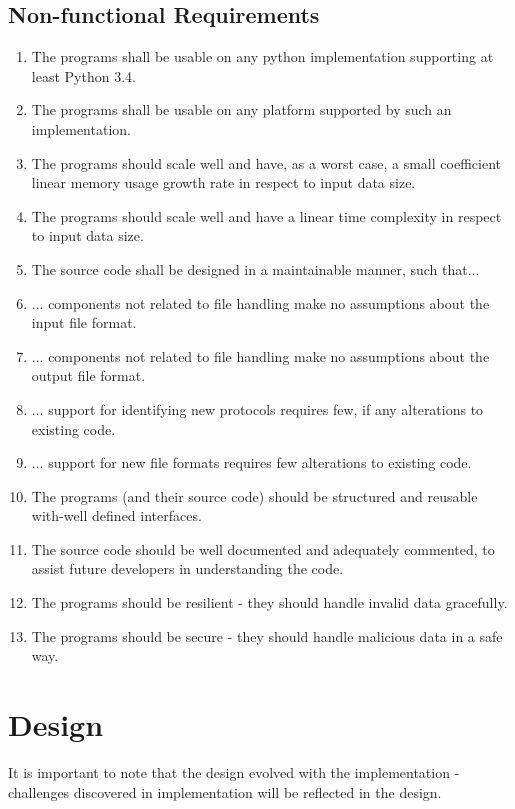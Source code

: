 \documentclass[10pt,a4paper,notitlepage,twoside]{report}
\begin{document}
\section{Non-functional Requirements}
\begin{enumerate}[label=\bfseries NFR\arabic*:]
\item \label{nfr:1} The programs shall be usable on any python implementation supporting at least Python 3.4.
\item \label{nfr:2} The programs shall be usable on any platform supported by such an implementation.
\item \label{nfr:3} The programs should scale well and have, as a worst case, a small coefficient linear memory usage growth rate in respect to input data size.
\item \label{nfr:4} The programs should scale well and have a linear time complexity in respect to input data size.
\item \label{nfr:5} The source code shall be designed in a maintainable manner, such that...
\item \label{nfr:6} ... components not related to file handling make no assumptions about the input file format.
\item \label{nfr:7} ... components not related to file handling make no assumptions about the output file format.
\item \label{nfr:8} ... support for identifying new protocols requires few, if any alterations to existing code.
\item \label{nfr:9} ... support for new file formats requires few alterations to existing code.
\item \label{nfr:10} The programs (and their source code) should be structured and reusable with-well defined interfaces.
\item \label{nfr:11} The source code should be well documented and adequately commented, to assist future developers in understanding the code.
\item \label{nfr:12} The programs should be resilient - they should handle invalid data gracefully.
\item \label{nfr:13} The programs should be secure - they should handle malicious data in a safe way.
\end{enumerate}

\chapter{Design}
It is important to note that the design evolved with the implementation - challenges discovered in implementation will be reflected in the design.
\end{document}
